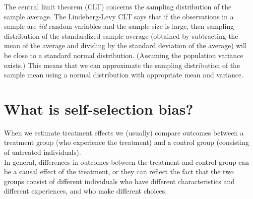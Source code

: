 \documentclass[%
 aip,
 jmp,%
 amsmath,amssymb,
 reprint,%
]{revtex4-1}
\begin{document}
The central limit theorem (CLT) concerns the sampling distribution of the sample average.
The Lindeberg-Levy CLT says that if the observations in a sample are \textit{iid} random variables
and the sample size is large, then sampling distribution of the standardized sample average
(obtained by subtracting the mean of the average and dividing by the standard deviation of the
average) will be close to a standard normal distribution. (Assuming the population variance
exists.) This means that we can approximate the sampling distribution of the sample mean
using a normal distribution with appropriate mean and variance.\\



\section*{What is self-selection bias?}

When we estimate treatment effects we (usually) compare outcomes between a treatment
group (who experience the treatment) and a control group (consisting of untreated
individuals).\\

In general, differences in outcomes between the treatment and control group can be a
causal effect of the treatment, or they can reflect the fact that the two groups consist of
different individuals who have different characteristics and different experiences, and who
make different choices.\\
\end{document}
